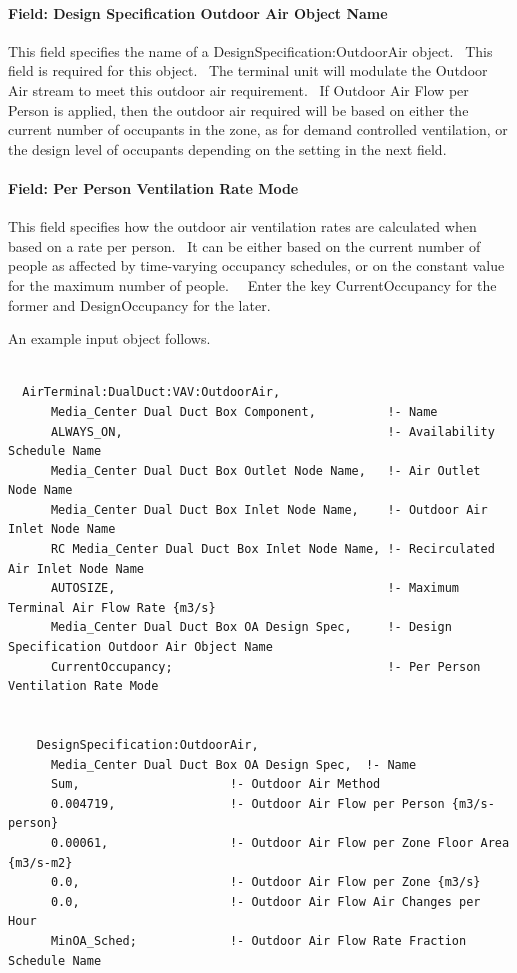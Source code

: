 \paragraph{Field: Design Specification Outdoor Air Object Name}\label{field-design-specification-outdoor-air-object-name-3}

This field specifies the name of a DesignSpecification:OutdoorAir object.~ This field is required for this object.~ The terminal unit will modulate the Outdoor Air stream to meet this outdoor air requirement.~ If Outdoor Air Flow per Person is applied, then the outdoor air required will be based on either the current number of occupants in the zone, as for demand controlled ventilation, or the design level of occupants depending on the setting in the next field.

\paragraph{Field: Per Person Ventilation Rate Mode}\label{field-per-person-ventilation-rate-mode}

This field specifies how the outdoor air ventilation rates are calculated when based on a rate per person.~ It can be either based on the current number of people as affected by time-varying occupancy schedules, or on the constant value for the maximum number of people.~~ Enter the key CurrentOccupancy for the former and DesignOccupancy for the later.

An example input object follows.

\begin{lstlisting}

  AirTerminal:DualDuct:VAV:OutdoorAir,
      Media_Center Dual Duct Box Component,          !- Name
      ALWAYS_ON,                                     !- Availability Schedule Name
      Media_Center Dual Duct Box Outlet Node Name,   !- Air Outlet Node Name
      Media_Center Dual Duct Box Inlet Node Name,    !- Outdoor Air Inlet Node Name
      RC Media_Center Dual Duct Box Inlet Node Name, !- Recirculated Air Inlet Node Name
      AUTOSIZE,                                      !- Maximum Terminal Air Flow Rate {m3/s}
      Media_Center Dual Duct Box OA Design Spec,     !- Design Specification Outdoor Air Object Name
      CurrentOccupancy;                              !- Per Person Ventilation Rate Mode


    DesignSpecification:OutdoorAir,
      Media_Center Dual Duct Box OA Design Spec,  !- Name
      Sum,                     !- Outdoor Air Method
      0.004719,                !- Outdoor Air Flow per Person {m3/s-person}
      0.00061,                 !- Outdoor Air Flow per Zone Floor Area {m3/s-m2}
      0.0,                     !- Outdoor Air Flow per Zone {m3/s}
      0.0,                     !- Outdoor Air Flow Air Changes per Hour
      MinOA_Sched;             !- Outdoor Air Flow Rate Fraction Schedule Name
\end{lstlisting}

